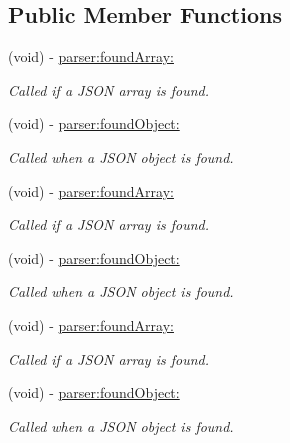 \subsection*{\-Public \-Member \-Functions}
\begin{DoxyCompactItemize}
\item 
(void) -\/ \hyperlink{protocol_s_b_json_stream_parser_adapter_delegate-p_acac3b4b2e4cfb45a8ca8ca945a47e326}{parser\-:found\-Array\-:}
\begin{DoxyCompactList}\small\item\em \-Called if a \-J\-S\-O\-N array is found. \end{DoxyCompactList}\item 
(void) -\/ \hyperlink{protocol_s_b_json_stream_parser_adapter_delegate-p_abefd538a1ce6d75eb3e8572a1049f597}{parser\-:found\-Object\-:}
\begin{DoxyCompactList}\small\item\em \-Called when a \-J\-S\-O\-N object is found. \end{DoxyCompactList}\item 
(void) -\/ \hyperlink{protocol_s_b_json_stream_parser_adapter_delegate-p_acac3b4b2e4cfb45a8ca8ca945a47e326}{parser\-:found\-Array\-:}
\begin{DoxyCompactList}\small\item\em \-Called if a \-J\-S\-O\-N array is found. \end{DoxyCompactList}\item 
(void) -\/ \hyperlink{protocol_s_b_json_stream_parser_adapter_delegate-p_abefd538a1ce6d75eb3e8572a1049f597}{parser\-:found\-Object\-:}
\begin{DoxyCompactList}\small\item\em \-Called when a \-J\-S\-O\-N object is found. \end{DoxyCompactList}\item 
(void) -\/ \hyperlink{protocol_s_b_json_stream_parser_adapter_delegate-p_acac3b4b2e4cfb45a8ca8ca945a47e326}{parser\-:found\-Array\-:}
\begin{DoxyCompactList}\small\item\em \-Called if a \-J\-S\-O\-N array is found. \end{DoxyCompactList}\item 
(void) -\/ \hyperlink{protocol_s_b_json_stream_parser_adapter_delegate-p_abefd538a1ce6d75eb3e8572a1049f597}{parser\-:found\-Object\-:}
\begin{DoxyCompactList}\small\item\em \-Called when a \-J\-S\-O\-N object is found. \end{DoxyCompactList}\item 

\end{DoxyCompactItemize}
